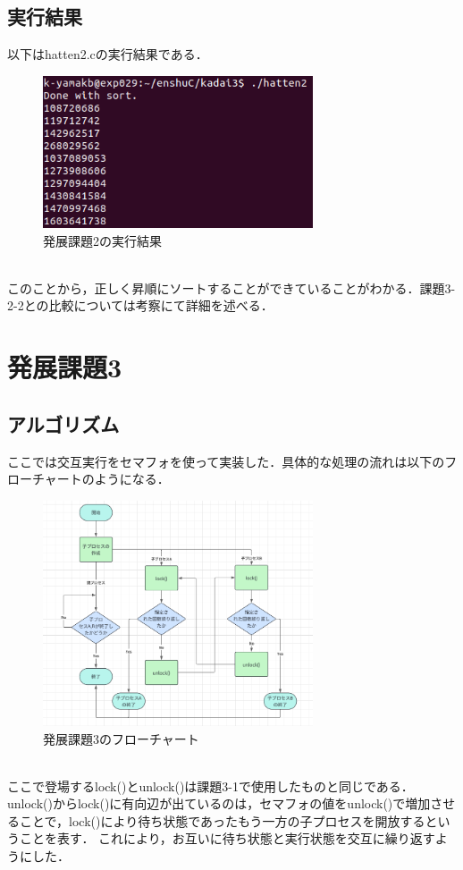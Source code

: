 \documentclass[dvipdfmx]{jarticle}
\begin{document}
\subsection{実行結果}
以下はhatten2.cの実行結果である．
\begin{figure}[h]
    \centering
    \includegraphics[width=8cm]{resulthatten2.png}
    \caption{発展課題2の実行結果}
\end{figure}
\\このことから，正しく昇順にソートすることができていることがわかる．課題3-2-2との比較については考察にて詳細を述べる．
\section{発展課題3}
\subsection{アルゴリズム}
ここでは交互実行をセマフォを使って実装した．具体的な処理の流れは以下のフローチャートのようになる．
\begin{figure}[h]
    \centering
    \includegraphics[width=8cm]{hatten3hurotya.png}
    \caption{発展課題3のフローチャート}
\end{figure}
\\ここで登場するlock()とunlock()は課題3-1で使用したものと同じである．unlock()からlock()に有向辺が出ているのは，セマフォの値をunlock()で増加させることで，lock()により待ち状態であったもう一方の子プロセスを開放するということを表す．
これにより，お互いに待ち状態と実行状態を交互に繰り返すようにした．
\end{document}
